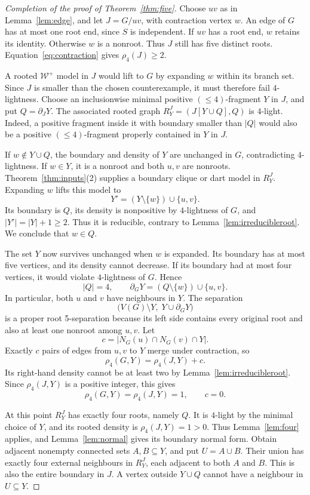 \documentclass[11pt]{article}
\theoremstyle{remark}
\numberwithin{equation}{section}
\newcommand{\W}{\mathcal W}
\newcommand{\dd}{\partial}
\begin{document}
\begin{proof}[Completion of the proof of Theorem~\ref{thm:five}]
Choose $uv$ as in Lemma~\ref{lem:edge}, and let $J=G/uv$, with contraction vertex $w$. An edge of $G$ has at most one root end, since $S$ is independent. If $uv$ has a root end, $w$ retains its identity. Otherwise $w$ is a nonroot. Thus $J$ still has five distinct roots. Equation~\eqref{eq:contraction} gives $\rho_4(J)\ge2$.

A rooted $\W^+$ model in $J$ would lift to $G$ by expanding $w$ within its branch set. Since $J$ is smaller than the chosen counterexample, it must therefore fail $4$-lightness. Choose an inclusionwise minimal positive $(\le4)$-fragment $Y$ in $J$, and put $Q=\dd_JY$. The associated rooted graph $R_Y^J=(J[Y\cup Q],Q)$ is $4$-light. Indeed, a positive fragment inside it with boundary smaller than $|Q|$ would also be a positive $(\le4)$-fragment properly contained in $Y$ in $J$.

If $w\notin Y\cup Q$, the boundary and density of $Y$ are unchanged in $G$, contradicting $4$-lightness. If $w\in Y$, it is a nonroot and both $u,v$ are nonroots. Theorem~\ref{thm:inputs}(2) supplies a boundary clique or dart model in $R_Y^J$. Expanding $w$ lifts this model to
\[
Y'=(Y\setminus\{w\})\cup\{u,v\}.
\]
Its boundary is $Q$, its density is nonpositive by $4$-lightness of $G$, and $|Y'|=|Y|+1\ge2$. Thus it is reducible, contrary to Lemma~\ref{lem:irreducibleroot}. We conclude that $w\in Q$.

The set $Y$ now survives unchanged when $w$ is expanded. Its boundary has at most five vertices, and its density cannot decrease. If its boundary had at most four vertices, it would violate $4$-lightness of $G$. Hence
\[
|Q|=4,\qquad \dd_GY=(Q\setminus\{w\})\cup\{u,v\}.
\]
In particular, both $u$ and $v$ have neighbours in $Y$. The separation
\[
\bigl(V(G)\setminus Y,\;Y\cup\dd_GY\bigr)
\]
is a proper root 5-separation because its left side contains every original root and also at least one nonroot among $u,v$. Let
\[
c=|N_G(u)\cap N_G(v)\cap Y|.
\]
Exactly $c$ pairs of edges from $u,v$ to $Y$ merge under contraction, so
\[
\rho_4(G,Y)=\rho_4(J,Y)+c.
\]
Its right-hand density cannot be at least two by Lemma~\ref{lem:irreducibleroot}. Since $\rho_4(J,Y)$ is a positive integer, this gives
\begin{equation}\label{eq:split}
\rho_4(G,Y)=\rho_4(J,Y)=1,\qquad c=0.
\end{equation}

At this point $R_Y^J$ has exactly four roots, namely $Q$. It is $4$-light by the minimal choice of $Y$, and its rooted density is $\rho_4(J,Y)=1>0$. Thus Lemma~\ref{lem:four} applies, and Lemma~\ref{lem:normal} gives its boundary normal form. Obtain adjacent nonempty connected sets $A,B\subseteq Y$, and put $U=A\cup B$. Their union has exactly four external neighbours in $R_Y^J$, each adjacent to both $A$ and $B$. This is also the entire boundary in $J$. A vertex outside $Y\cup Q$ cannot have a neighbour in $U\subseteq Y$.


\end{proof}
\end{document}
